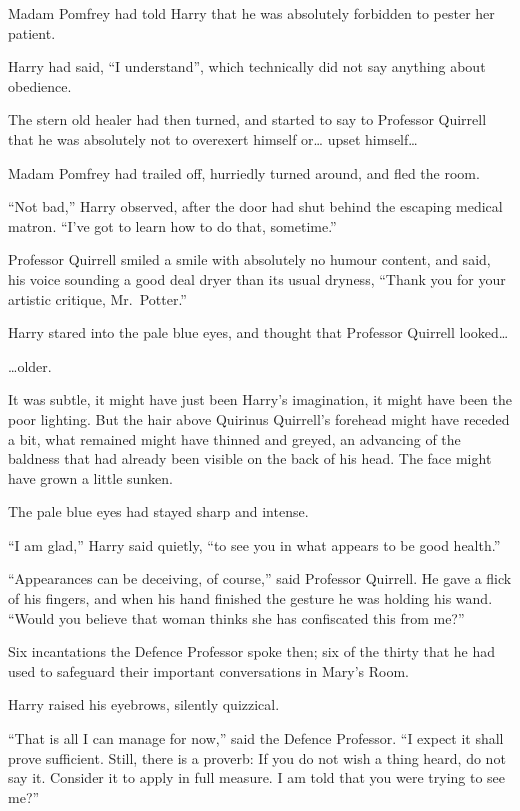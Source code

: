 Madam Pomfrey had told Harry that he was absolutely forbidden to pester
her patient.

Harry had said, ``I understand'', which technically did not say anything
about obedience.

The stern old healer had then turned, and started to say to Professor
Quirrell that he was absolutely not to overexert himself or\ldots{}
upset himself\ldots{}

Madam Pomfrey had trailed off, hurriedly turned around, and fled the
room.

``Not bad,'' Harry observed, after the door had shut behind the escaping
medical matron. ``I've got to learn how to do that, sometime.''

Professor Quirrell smiled a smile with absolutely no humour content, and
said, his voice sounding a good deal dryer than its usual dryness,
``Thank you for your artistic critique, Mr.~Potter.''

Harry stared into the pale blue eyes, and thought that Professor
Quirrell looked\ldots{}

\ldots{}older.

It was subtle, it might have just been Harry's imagination, it might
have been the poor lighting. But the hair above Quirinus Quirrell's
forehead might have receded a bit, what remained might have thinned and
greyed, an advancing of the baldness that had already been visible on
the back of his head. The face might have grown a little sunken.

The pale blue eyes had stayed sharp and intense.

``I am glad,'' Harry said quietly, ``to see you in what appears to be
good health.''

``Appearances can be deceiving, of course,'' said Professor Quirrell. He
gave a flick of his fingers, and when his hand finished the gesture he
was holding his wand. ``Would you believe that woman thinks she has
confiscated this from me?''

Six incantations the Defence Professor spoke then; six of the thirty
that he had used to safeguard their important conversations in Mary's
Room.

Harry raised his eyebrows, silently quizzical.

``That is all I can manage for now,'' said the Defence Professor. ``I
expect it shall prove sufficient. Still, there is a proverb: If you do
not wish a thing heard, do not say it. Consider it to apply in full
measure. I am told that you were trying to see me?''

